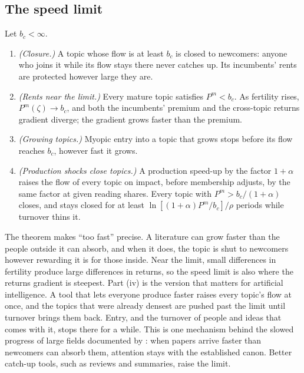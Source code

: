\subsection{The speed limit}

\begin{theorem}\label{thm:speed}
Let $b_c<\infty$.
\begin{enumerate}[label=(\roman*)]
\item \emph{(Closure.)} A topic whose flow is at least $b_c$ is closed to newcomers: anyone who joins it while its flow stays there never catches up. Its incumbents' rents are protected however large they are.
\item \emph{(Rents near the limit.)} Every mature topic satisfies $P^m<b_c$. As fertility rises, $P^m(\zeta)\to b_c$, and both the incumbents' premium and the cross-topic returns gradient diverge; the gradient grows faster than the premium.
\item \emph{(Growing topics.)} Myopic entry into a topic that grows stops before its flow reaches $b_c$, however fast it grows.
\item \emph{(Production shocks close topics.)} A production speed-up by the factor $1+\alpha$ raises the flow of every topic on impact, before membership adjusts, by the same factor at given reading shares. Every topic with $P^m>b_c/(1+\alpha)$ closes, and stays closed for at least $\ln[(1+\alpha)P^m/b_c]/\rho$ periods while turnover thins it.
\end{enumerate}
\end{theorem}

The theorem makes ``too fast'' precise. A literature can grow faster than the
people outside it can absorb, and when it does, the topic is shut to
newcomers however rewarding it is for those inside. Near the limit, small
differences in fertility produce large differences in returns, so the speed
limit is also where the returns gradient is steepest. Part (iv) is the version
that matters for artificial intelligence. A tool that lets everyone produce
faster raises every topic's flow at once, and the topics that were already
densest are pushed past the limit until turnover brings them back. Entry, and
the turnover of people and ideas that comes with it, stops there for a while.
This is one mechanism behind the slowed progress of large fields documented by
\citet{chuevans2021}: when papers arrive faster than newcomers can absorb them,
attention stays with the established canon. Better catch-up tools, such as
reviews and summaries, raise the limit.

